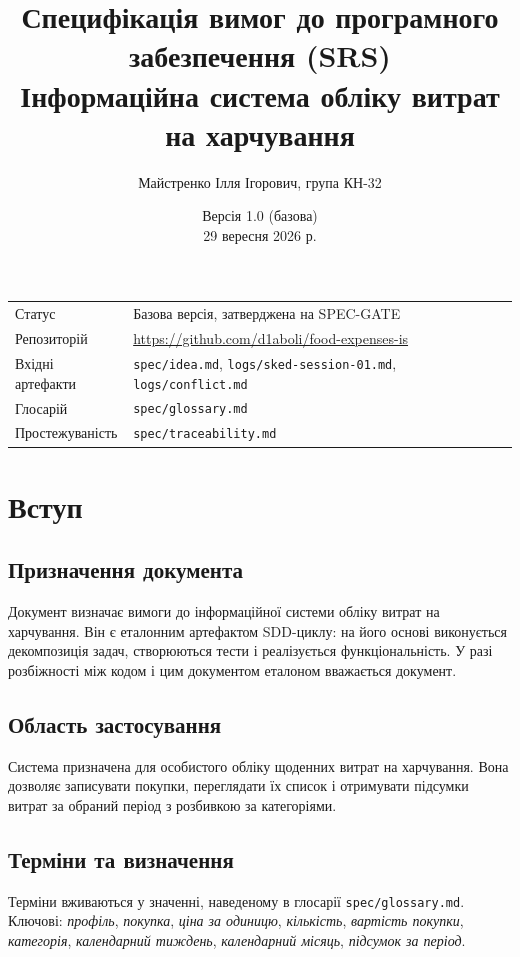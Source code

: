 \documentclass[12pt,a4paper]{article}
\title{\textbf{Специфікація вимог до програмного забезпечення (SRS)}\\[4pt]
\large Інформаційна система обліку витрат на харчування}
\author{Майстренко Ілля Ігорович, група КН-32}
\date{Версія 1.0 (базова) \\ 29 вересня 2026 р.}
\begin{document}
\maketitle

\begin{center}
\begin{tabular}{@{}ll@{}}
\toprule
Статус & Базова версія, затверджена на SPEC-GATE \\
Репозиторій & \url{https://github.com/d1aboli/food-expenses-is} \\
Вхідні артефакти & \texttt{spec/idea.md}, \texttt{logs/sked-session-01.md}, \texttt{logs/conflict.md} \\
Глосарій & \texttt{spec/glossary.md} \\
Простежуваність & \texttt{spec/traceability.md} \\
\bottomrule
\end{tabular}
\end{center}

\tableofcontents
\newpage

\section{Вступ}

\subsection{Призначення документа}
Документ визначає вимоги до інформаційної системи обліку витрат на харчування. Він є еталонним
артефактом SDD-циклу: на його основі виконується декомпозиція задач, створюються тести
і реалізується функціональність. У разі розбіжності між кодом і цим документом еталоном вважається документ.

\subsection{Область застосування}
Система призначена для особистого обліку щоденних витрат на харчування. Вона дозволяє записувати покупки,
переглядати їх список і отримувати підсумки витрат за обраний період з розбивкою за категоріями.

\subsection{Терміни та визначення}
Терміни вживаються у значенні, наведеному в глосарії \texttt{spec/glossary.md}. Ключові:
\textit{профіль}, \textit{покупка}, \textit{ціна за одиницю}, \textit{кількість}, \textit{вартість покупки},
\textit{категорія}, \textit{календарний тиждень}, \textit{календарний місяць}, \textit{підсумок за період}.
\end{document}
